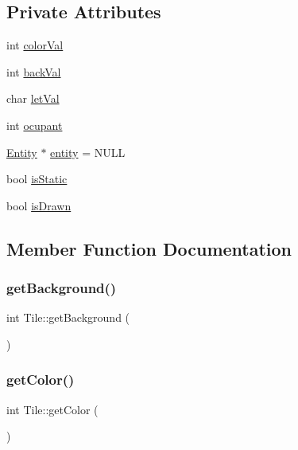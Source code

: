 \subsection*{Private Attributes}
\begin{DoxyCompactItemize}
\item 
int \hyperlink{class_tile_a8efdefc17cf532e796789270fd30d99c}{color\+Val}
\item 
int \hyperlink{class_tile_a0e5e0d18592fe9d3be27496bb666dde3}{back\+Val}
\item 
char \hyperlink{class_tile_a57723b26da8821d5931d74e4d4a02379}{let\+Val}
\item 
int \hyperlink{class_tile_a9370b4e54fcb4185e47571133ad51cc0}{ocupant}
\item 
\hyperlink{class_entity}{Entity} $\ast$ \hyperlink{class_tile_a0dd60fad81006fc55f4395b699e20736}{entity} = N\+U\+LL
\item 
bool \hyperlink{class_tile_ab6e4b6050959c3be7f3db33d5013c645}{is\+Static}
\item 
bool \hyperlink{class_tile_a64b60deed66d5fa1e5c9ddbbf3c82096}{is\+Drawn}
\end{DoxyCompactItemize}


\subsection{Member Function Documentation}
\mbox{\label{class_tile_a19a39bb8af4bac1330b13248397f5676}} 
\subsubsection{\texorpdfstring{get\+Background()}{getBackground()}}
{\footnotesize\ttfamily int Tile\+::get\+Background (\begin{DoxyParamCaption}{ }\end{DoxyParamCaption})\hspace{0.3cm}{\ttfamily [inline]}}

\mbox{\label{class_tile_a1f78cc2af18988a498efb5a835ba3099}} 
\subsubsection{\texorpdfstring{get\+Color()}{getColor()}}
{\footnotesize\ttfamily int Tile\+::get\+Color (\begin{DoxyParamCaption}{ }\end{DoxyParamCaption})\hspace{0.3cm}{\ttfamily [inline]}}

